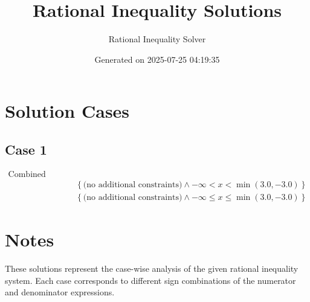 \documentclass{article}
\title{Rational Inequality Solutions}
\author{Rational Inequality Solver}
\date{Generated on 2025-07-25 04:19:35}
\begin{document}
\maketitle

\section{Solution Cases}

\subsection{Case 1}

\begin{align}
\text{Combined Cases} \\
& \left\{\text{(no additional constraints)} \wedge -\infty < x < \min\left(3.0, -3.0\right)\right\} \\
& \left\{\text{(no additional constraints)} \wedge -\infty \le x \le \min\left(3.0, -3.0\right)\right\}
\end{align}


\section{Notes}

These solutions represent the case-wise analysis of the given rational inequality system. Each case corresponds to different sign combinations of the numerator and denominator expressions.
\end{document}
